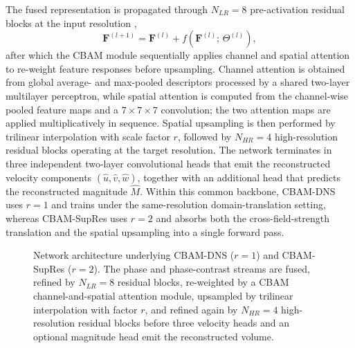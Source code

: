 The fused representation is propagated through $N_{LR}=8$ pre-activation
residual blocks at the input resolution \cite{he2016resnet},
\begin{equation}
    \mathbf{F}^{(l+1)} = \mathbf{F}^{(l)}
        + f\!\left(\mathbf{F}^{(l)};\, \Theta^{(l)}\right),
\end{equation}
after which the CBAM module sequentially applies channel and spatial
attention to re-weight feature responses before upsampling. Channel
attention is obtained from global average- and max-pooled descriptors
processed by a shared two-layer multilayer perceptron, while spatial
attention is computed from the channel-wise pooled feature maps and a
$7{\times}7{\times}7$ convolution; the two attention maps are applied
multiplicatively in sequence. Spatial upsampling is then performed by
trilinear interpolation with scale factor $r$, followed by $N_{HR}=4$
high-resolution residual blocks operating at the target resolution. The
network terminates in three independent two-layer convolutional heads
that emit the reconstructed velocity components
$(\hat{u}, \hat{v}, \hat{w})$, together with an additional head that
predicts the reconstructed magnitude $\hat{M}$. Within this common
backbone, CBAM-DNS uses $r=1$ and trains under the same-resolution
domain-translation setting, whereas CBAM-SupRes uses $r=2$ and absorbs
both the cross-field-strength translation and the spatial upsampling
into a single forward pass.

\begin{figure}[!htbp]
    \centering
    \caption{Network architecture underlying CBAM-DNS ($r=1$) and
    CBAM-SupRes ($r=2$). The phase and phase-contrast streams are fused,
    refined by $N_{LR}=8$ residual blocks, re-weighted by a CBAM
    channel-and-spatial attention module, upsampled by trilinear
    interpolation with factor $r$, and refined again by $N_{HR}=4$
    high-resolution residual blocks before three velocity heads and an
    optional magnitude head emit the reconstructed volume.}
    \label{fig:architecture}
\end{figure}

